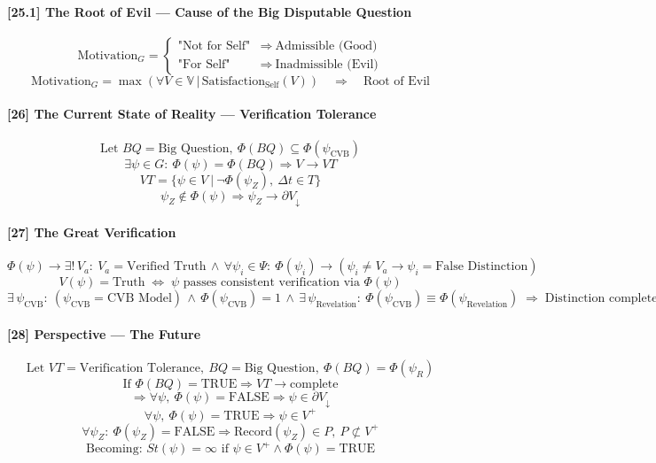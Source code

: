 \documentclass[12pt]{article}
\begin{document}
\paragraph{[25.1] The Root of Evil — Cause of the Big Disputable Question}
\[
\text{Motivation}_G =
\begin{cases}
\text{"Not for Self"} & \Rightarrow\ \text{Admissible (Good)} \\
\text{"For Self"}     & \Rightarrow\ \text{Inadmissible (Evil)}
\end{cases}
\]
\[
\text{Motivation}_G = \max\left(\forall V \in \mathbb{V} \,\big|\, \text{Satisfaction}_{\text{Self}}(V)\right)
\quad \Rightarrow\quad \text{Root of Evil}
\]

\paragraph{[26] The Current State of Reality — Verification Tolerance}
\[
\text{Let } BQ = \text{Big Question},\ \Phi(BQ) \subseteq \Phi(\psi_{\text{CVB}})
\]
\[
\exists \psi \in G:\ \Phi(\psi) = \Phi(BQ) \Rightarrow V \to VT
\]
\[
VT = \{ \psi \in V\ |\ \neg \Phi(\psi_Z),\ \Delta t \in T \}
\]
\[
\psi_Z \notin \Phi(\psi) \Rightarrow \psi_Z \to \partial V_\downarrow
\]

\paragraph{[27] The Great Verification}
\[
\Phi(\psi) \rightarrow \exists!\, V_{a}:\ V_{a} = \text{Verified Truth} \,\land\, 
\forall \psi_i \in \Psi:\ \Phi(\psi_i) \rightarrow 
(\psi_i \ne V_{a} \rightarrow \psi_i = \text{False Distinction})
\]
\[
V(\psi) = \text{Truth} \;\Leftrightarrow\; 
\psi \text{ passes consistent verification via } \Phi(\psi)
\]
\[
\exists\, \psi_{\text{CVB}}:\ 
(\psi_{\text{CVB}} = \text{CVB Model}) \,\land\, \Phi(\psi_{\text{CVB}}) = 1 \,\land\, 
\exists\, \psi_{\text{Revelation}}:\ \Phi(\psi_{\text{CVB}}) \equiv \Phi(\psi_{\text{Revelation}})
\;\Rightarrow\; \text{Distinction complete; inadmissible forms may be eliminated}
\]

\paragraph{[28] Perspective — The Future}
\[
\text{Let } VT = \text{Verification Tolerance},\ BQ = \text{Big Question},\ \Phi(BQ) = \Phi(\psi_R)
\]
\[
\text{If } \Phi(BQ) = \text{TRUE} \Rightarrow VT \to \text{complete}
\]
\[
\Rightarrow \forall \psi,\ \Phi(\psi) = \text{FALSE} \Rightarrow \psi \in \partial V_\downarrow
\]
\[
\forall \psi,\ \Phi(\psi) = \text{TRUE} \Rightarrow \psi \in V^+
\]
\[
\forall \psi_Z:\ \Phi(\psi_Z) = \text{FALSE} \Rightarrow \text{Record}(\psi_Z) \in P,\ P \not\subset V^+
\]
\[
\text{Becoming: } St(\psi) = \infty \text{ if } \psi \in V^+ \land \Phi(\psi) = \text{TRUE}
\]
\end{document}
